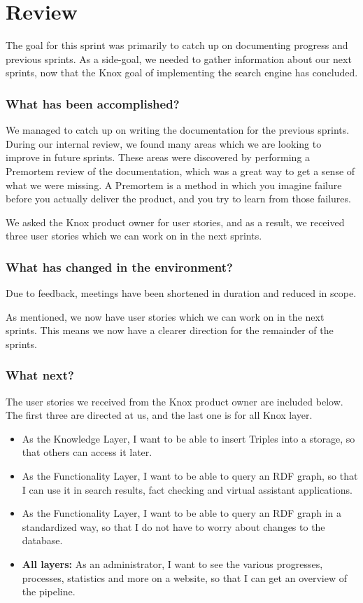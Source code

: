 \section{Review}
The goal for this sprint was primarily to catch up on documenting progress and previous sprints. As a side-goal, we needed to gather information about our next sprints, now that the Knox goal of implementing the search engine has concluded.

\subsubsection*{What has been accomplished?}
We managed to catch up on writing the documentation for the previous sprints. During our internal review, we found many areas which we are looking to improve in future sprints. These areas were discovered by performing a Premortem review of the documentation, which was a great way to get a sense of what we were missing. A Premortem is a method in which you imagine failure before you actually deliver the product, and you try to learn from those failures.

We asked the Knox product owner for user stories, and as a result, we received three user stories which we can work on in the next sprints.

\subsubsection*{What has changed in the environment?}
Due to feedback, meetings have been shortened in duration and reduced in scope. 

As mentioned, we now have user stories which we can work on in the next sprints. This means we now have a clearer direction for the remainder of the sprints.

\subsubsection*{What next?}
The user stories we received from the Knox product owner are included below. The first three are directed at us, and the last one is for all Knox layer.

\begin{itemize}
    \item As the Knowledge Layer, I want to be able to insert Triples into a storage, so that others can access it later.
    \item As the Functionality Layer, I want to be able to query an RDF graph, so that I can use it in search results, fact checking and virtual assistant applications.
    \item As the Functionality Layer, I want to be able to query an RDF graph in a standardized way, so that I do not have to worry about changes to the database.
    \item \textbf{All layers:} As an administrator, I want to see the various progresses, processes, statistics and more on a website, so that I can get an overview of the pipeline. 
\end{itemize} 

